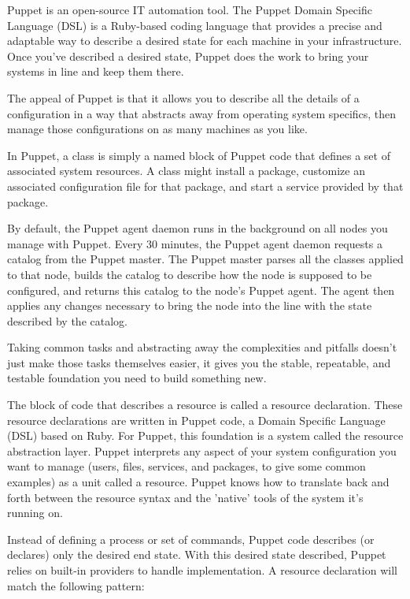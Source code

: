Puppet is an open-source IT automation tool. The Puppet Domain Specific Language (DSL) is a Ruby-based coding language that provides a precise and adaptable way to describe a desired state for each machine in your infrastructure. Once you've described a desired state, Puppet does the work to bring your systems in line and keep them there.

The appeal of Puppet is that it allows you to describe all the details of a configuration in a way that abstracts away from operating system specifics, then manage those configurations on as many machines as you like.

In Puppet, a class is simply a named block of Puppet code that defines a set of associated system resources. A class might install a package, customize an associated configuration file for that package, and start a service provided by that package.

By default, the Puppet agent daemon runs in the background on all nodes you manage with Puppet. Every 30 minutes, the Puppet agent daemon requests a catalog from the Puppet master. The Puppet master parses all the classes applied to that node, builds the catalog to describe how the node is supposed to be configured, and returns this catalog to the node's Puppet agent. The agent then applies any changes necessary to bring the node into the line with the state described by the catalog.

Taking common tasks and abstracting away the complexities and pitfalls doesn't just make those tasks themselves easier, it gives you the stable, repeatable, and testable foundation you need to build something new. 

The block of code that describes a resource is called a resource declaration. These resource declarations are written in Puppet code, a Domain Specific Language (DSL) based on Ruby. For Puppet, this foundation is a system called the resource abstraction layer. Puppet interprets any aspect of your system configuration you want to manage (users, files, services, and packages, to give some common examples) as a unit called a resource. Puppet knows how to translate back and forth between the resource syntax and the 'native' tools of the system it's running on.

Instead of defining a process or set of commands, Puppet code describes (or declares) only the desired end state. With this desired state described, Puppet relies on built-in providers to handle implementation. A resource declaration will match the following pattern:

